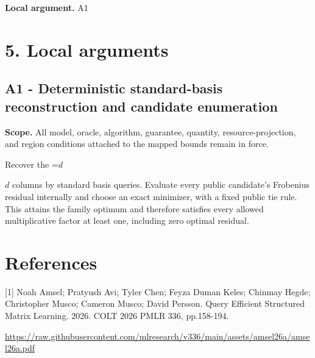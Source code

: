 \documentclass[10pt,a4paper]{article}
\newcommand{\AtlasMath}[1]{\par\begingroup\centering\setbox0=\hbox{$\displaystyle #1$}\ifdim\wd0>1.4\linewidth\typeout{ATLAS WIDE FORMULA: \the\wd0}\fi\ifdim\wd0>\linewidth\resizebox{\linewidth}{!}{\box0}\else\box0\fi\par\endgroup}
\newcommand{\AtlasInlineMath}[1]{\begingroup\setbox0=\hbox{$#1$}\ifdim\wd0>.4\linewidth\endgroup\AtlasMath{#1}\else\endgroup$#1$\fi}
\begin{document}
\textbf{Local argument.} A1

\section{5. Local arguments}
\subsection{A1 - Deterministic standard-basis reconstruction and candidate enumeration}
\textbf{Scope.} All model, oracle, algorithm, guarantee, quantity, resource-projection, and region conditions attached to the mapped bounds remain in force.

Recover the \AtlasInlineMath{d} columns by standard basis queries. Evaluate every public candidate's Frobenius residual internally and choose an exact minimizer, with a fixed public tie rule. This attains the family optimum and therefore satisfies every allowed multiplicative factor at least one, including zero optimal residual.

\section{References}
[1] Noah Amsel; Pratyush Avi; Tyler Chen; Feyza Duman Keles; Chinmay Hegde; Christopher Musco; Cameron Musco; David Persson. Query Efficient Structured Matrix Learning. 2026. COLT 2026 PMLR 336, pp.158-194.

\url{https://raw.githubusercontent.com/mlresearch/v336/main/assets/amsel26a/amsel26a.pdf}
\end{document}
